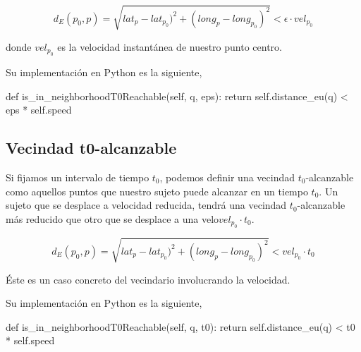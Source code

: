 \documentclass[a4paper, 12pt]{article}
\begin{document}
$$ d_E(p_0, p) = \sqrt{lat_{p} - lat_{p_0})^2 + (long_{p} - long_{p_0})^2 } < \epsilon \cdot vel_{p_0} $$

donde $vel_{p_0}$ es la velocidad instant\'anea de nuestro punto centro.


Su implementaci\'on en Python es la siguiente,

\begin{python}
        def is_in_neighborhoodT0Reachable(self, q, eps):
                return self.distance_eu(q) < eps * self.speed
\end{python}


%
%
%
%
%
%

\subsection{Vecindad t0-alcanzable}

Si fijamos un intervalo de tiempo $t_0$, podemos definir una vecindad $t_0$-alcanzable como aquellos puntos que nuestro sujeto puede alcanzar en un tiempo $t_0$. Un sujeto que se desplace a velocidad reducida, tendr\'a una vecindad $t_0$-alcanzable m\'as reducido  que otro que se desplace a una velo$vel_{p_0}\cdot t_0$. 

$$ d_E(p_0, p) = \sqrt{lat_{p} - lat_{p_0})^2 + (long_{p} - long_{p_0})^2 } < vel_{p_0} \cdot t_0 $$

\'Este es un caso concreto del vecindario involucrando la velocidad. 


Su implementaci\'on en Python es la siguiente,

\begin{python}
        def is_in_neighborhoodT0Reachable(self, q, t0):
                return self.distance_eu(q) < t0 * self.speed
\end{python}
\end{document}
